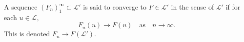 A sequence $(F_n)_{1}^{\infty} \subset \mathcal{L}'$ is said to converge to $F \in \mathcal{L}'$ in the sense of $\mathcal{L}'$ if for each $u \in \mathcal{L}$,
$$F_n(u) \to F(u) \quad \text{as} \quad n \to \infty.$$
This is denoted $F_n \to F (\mathcal{L}')$.
